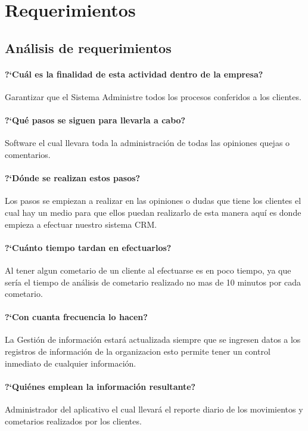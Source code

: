 \chapter{Requerimientos}
\section{An\'alisis de requerimientos}
\subsubsection{?`Cu\'al es la finalidad de esta actividad dentro de la empresa?}
%
Garantizar que el Sistema Administre todos los procesos conferidos a los clientes.%
%
\subsubsection{?`Qu\'e pasos se siguen para llevarla a cabo?}
%
Software el cual llevara toda la administraci\'on de todas las opiniones quejas o comentarios.%
%
\subsubsection{?`D\'onde se realizan estos pasos?}
%
Los pasos se empiezan a realizar en las opiniones o dudas que tiene los clientes el cual hay un medio para que ellos puedan realizarlo de esta manera aqu\'i es donde empieza a efectuar nuestro sistema CRM.%
%
\subsubsection{?`Cu\'anto tiempo tardan en efectuarlos?}
%
Al tener algun cometario de un cliente al efectuarse es en poco tiempo, ya que ser\'ia el tiempo de an\'alisis de cometario realizado no mas de 10 minutos por cada cometario.%
%
\subsubsection{?`Con cuanta frecuencia lo hacen?}
%
La Gesti\'on de informaci\'on estar\'a actualizada siempre que se ingresen datos a los registros de informaci\'on de la organizacion esto permite tener un control inmediato de cualquier informaci\'on.%
%
\subsubsection{?`Qui\'enes emplean la informaci\'on resultante?}
%
Administrador del aplicativo el cual llevar\'a el reporte diario de los movimientos y cometarios realizados por los clientes.%